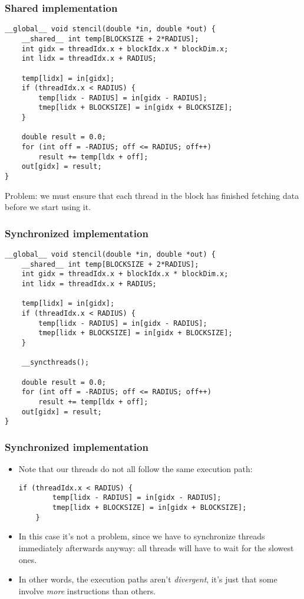 \begin{frame}[fragile]
  \frametitle{Shared implementation}
  \begin{lstlisting}[style=cuda, basicstyle=\ttfamily\scriptsize]
__global__ void stencil(double *in, double *out) {
    __shared__ int temp[BLOCKSIZE + 2*RADIUS];
    int gidx = threadIdx.x + blockIdx.x * blockDim.x;
    int lidx = threadIdx.x + RADIUS;

    temp[lidx] = in[gidx];
    if (threadIdx.x < RADIUS) {
        temp[lidx - RADIUS] = in[gidx - RADIUS];
        tmep[lidx + BLOCKSIZE] = in[gidx + BLOCKSIZE];
    }

    double result = 0.0;
    for (int off = -RADIUS; off <= RADIUS; off++)
        result += temp[ldx + off];
    out[gidx] = result;
}
  \end{lstlisting}
  Problem: we must ensure that each thread in the block has finished fetching
  data before we start using it.
\end{frame}

\begin{frame}[fragile]
  \frametitle{Synchronized implementation}
  \begin{lstlisting}[style=cuda, basicstyle=\ttfamily\scriptsize]
__global__ void stencil(double *in, double *out) {
    __shared__ int temp[BLOCKSIZE + 2*RADIUS];
    int gidx = threadIdx.x + blockIdx.x * blockDim.x;
    int lidx = threadIdx.x + RADIUS;

    temp[lidx] = in[gidx];
    if (threadIdx.x < RADIUS) {
        temp[lidx - RADIUS] = in[gidx - RADIUS];
        tmep[lidx + BLOCKSIZE] = in[gidx + BLOCKSIZE];
    }

    __syncthreads();

    double result = 0.0;
    for (int off = -RADIUS; off <= RADIUS; off++)
        result += temp[ldx + off];
    out[gidx] = result;
}
  \end{lstlisting}
\end{frame}

\begin{frame}[fragile]
  \frametitle{Synchronized implementation}
  \begin{itemize}
  \item Note that our threads do not all follow the same execution path:
  \begin{lstlisting}[style=cuda, basicstyle=\ttfamily\scriptsize]
    if (threadIdx.x < RADIUS) {
        temp[lidx - RADIUS] = in[gidx - RADIUS];
        tmep[lidx + BLOCKSIZE] = in[gidx + BLOCKSIZE];
    }
  \end{lstlisting}
  \item In this case it's not a problem, since we have to synchronize threads
    immediately afterwards anyway: all threads will have to wait for the slowest
    ones.
  \item In other words, the execution paths aren't \emph{divergent}, it's just
    that some involve \emph{more} instructions than others.
  \end{itemize}
\end{frame}


